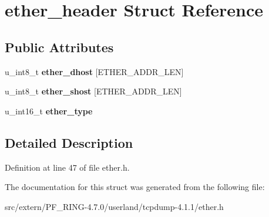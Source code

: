 \hypertarget{structether__header}{
\section{ether\_\-header Struct Reference}
\label{structether__header}
}
\subsection*{Public Attributes}
\begin{DoxyCompactItemize}
\item 
\hypertarget{structether__header_abcb2950d8844eb4847fd35aefa99ca1f}{
u\_\-int8\_\-t {\bfseries ether\_\-dhost} \mbox{[}ETHER\_\-ADDR\_\-LEN\mbox{]}}
\label{structether__header_abcb2950d8844eb4847fd35aefa99ca1f}

\item 
\hypertarget{structether__header_a05e5045d3766738dc930e81ac5246aad}{
u\_\-int8\_\-t {\bfseries ether\_\-shost} \mbox{[}ETHER\_\-ADDR\_\-LEN\mbox{]}}
\label{structether__header_a05e5045d3766738dc930e81ac5246aad}

\item 
\hypertarget{structether__header_a74a51d7b1a63d029be345f74fce2edf8}{
u\_\-int16\_\-t {\bfseries ether\_\-type}}
\label{structether__header_a74a51d7b1a63d029be345f74fce2edf8}

\end{DoxyCompactItemize}


\subsection{Detailed Description}


Definition at line 47 of file ether.h.



The documentation for this struct was generated from the following file:\begin{DoxyCompactItemize}
\item 
src/extern/PF\_\-RING-\/4.7.0/userland/tcpdump-\/4.1.1/ether.h\end{DoxyCompactItemize}
